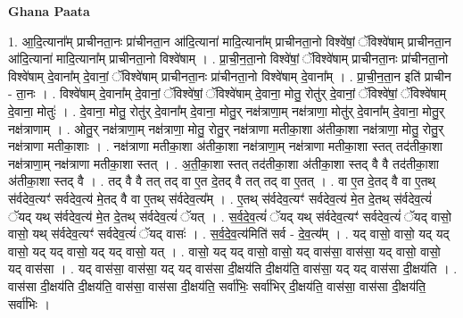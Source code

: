 \documentclass[17pt]{extarticle}
\begin{document}
\textbf{Ghana Paata } \newline

1. आ॒दि॒त्याना᳚म् प्राचीनता॒नः प्रा॑चीनता॒न आ॑दि॒त्याना॑ मादि॒त्याना᳚म् प्राचीनता॒नो विश्वे॑षां॒ ॅविश्वे॑षाम् प्राचीनता॒न आ॑दि॒त्याना॑ मादि॒त्याना᳚म् प्राचीनता॒नो विश्वे॑षाम् । . प्रा॒ची॒न॒ता॒नो विश्वे॑षां॒ ॅविश्वे॑षाम् प्राचीनता॒नः प्रा॑चीनता॒नो विश्वे॑षाम् दे॒वाना᳚म् दे॒वानां॒ ॅविश्वे॑षाम् प्राचीनता॒नः प्रा॑चीनता॒नो विश्वे॑षाम् दे॒वाना᳚म् । . प्रा॒ची॒न॒ता॒न इति॑ प्राचीन - ता॒नः । . विश्वे॑षाम् दे॒वाना᳚म् दे॒वानां॒ ॅविश्वे॑षां॒ ॅविश्वे॑षाम् दे॒वाना॒ मोतु॒ रोतु॑र् दे॒वानां॒ ॅविश्वे॑षां॒ ॅविश्वे॑षाम् दे॒वाना॒ मोतुः॑ । . दे॒वाना॒ मोतु॒ रोतु॑र् दे॒वाना᳚म् दे॒वाना॒ मोतु॒र् नक्ष॑त्राणा॒म् नक्ष॑त्राणा॒ मोतु॑र् दे॒वाना᳚म् दे॒वाना॒ मोतु॒र् नक्ष॑त्राणाम् । . ओतु॒र् नक्ष॑त्राणा॒म् नक्ष॑त्राणा॒ मोतु॒ रोतु॒र् नक्ष॑त्राणा मतीका॒शा अ॑तीका॒शा नक्ष॑त्राणा॒ मोतु॒ रोतु॒र् नक्ष॑त्राणा मतीका॒शाः । . नक्ष॑त्राणा मतीका॒शा अ॑तीका॒शा नक्ष॑त्राणा॒म् नक्ष॑त्राणा मतीका॒शा स्तत् तद॑तीका॒शा नक्ष॑त्राणा॒म् नक्ष॑त्राणा मतीका॒शा स्तत् । . अ॒ती॒का॒शा स्तत् तद॑तीका॒शा अ॑तीका॒शा स्तद् वै वै तद॑तीका॒शा अ॑तीका॒शा स्तद् वै । . तद् वै वै तत् तद् वा ए॒त दे॒तद् वै तत् तद् वा ए॒तत् । . वा ए॒त दे॒तद् वै वा ए॒तथ् स॑र्वदेव॒त्यꣳ॑ सर्वदेव॒त्य॑ मे॒तद् वै वा ए॒तथ् स॑र्वदेव॒त्य᳚म् । . ए॒तथ् स॑र्वदेव॒त्यꣳ॑ सर्वदेव॒त्य॑ मे॒त दे॒तथ् स॑र्वदेव॒त्यं॑ ॅयद् यथ् स॑र्वदेव॒त्य॑ मे॒त दे॒तथ् स॑र्वदेव॒त्यं॑ ॅयत् । . स॒र्व॒दे॒व॒त्यं॑ ॅयद् यथ् स॑र्वदेव॒त्यꣳ॑ सर्वदेव॒त्यं॑ ॅयद् वासो॒ वासो॒ यथ् स॑र्वदेव॒त्यꣳ॑ सर्वदेव॒त्यं॑ ॅयद् वासः॑ । . स॒र्व॒दे॒व॒त्य॑मिति॑ सर्व - दे॒व॒त्य᳚म् । . यद् वासो॒ वासो॒ यद् यद् वासो॒ यद् यद् वासो॒ यद् यद् वासो॒ यत् । . वासो॒ यद् यद् वासो॒ वासो॒ यद् वास॑सा॒ वास॑सा॒ यद् वासो॒ वासो॒ यद् वास॑सा । . यद् वास॑सा॒ वास॑सा॒ यद् यद् वास॑सा दी॒क्षय॑ति दी॒क्षय॑ति॒ वास॑सा॒ यद् यद् वास॑सा दी॒क्षय॑ति । . वास॑सा दी॒क्षय॑ति दी॒क्षय॑ति॒ वास॑सा॒ वास॑सा दी॒क्षय॑ति॒ सर्वा॑भिः॒ सर्वा॑भिर् दी॒क्षय॑ति॒ वास॑सा॒ वास॑सा दी॒क्षय॑ति॒ सर्वा॑भिः । \newline
\end{document}
